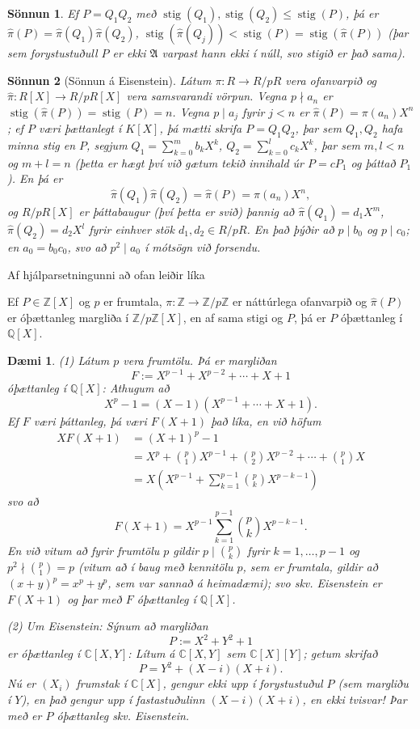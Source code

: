 \documentclass[a4paper,icelandic,11pt]{book}
\theoremstyle{plain}
\newtheorem{daemi}{Dæmi}[chapter]
\newtheorem*{sonnun}{Sönnun}
\newcommand{\Z}{\mathbb{Z}}
\newcommand{\Q}{\mathbb{Q}}
\newcommand{\C}{\mathbb{C}}
\DeclareMathOperator{\stig}{stig} %
\begin{document}
\begin{sonnun}
  Ef $P = Q_1 Q_2$ með $\stig(Q_1),\stig(Q_2)\leq \stig(P)$,  þá er $\hat\pi(P)
  = \hat\pi(Q_1)\hat\pi(Q_2)$, $\stig(\hat\pi(Q_j)) <
  \stig(P)=\stig(\hat\pi(P))$ (þar sem forystustuðull $P$ er ekki $\mathfrak A$
  varpast hann ekki í núll, svo stigið er það sama).
\end{sonnun}
\begin{sonnun}
  [Sönnun á Eisenstein]
  Látum $\pi : R\to R/pR$ vera ofanvarpið og $\hat\pi : R[X]\to R/pR[X]$ vera
  samsvarandi vörpun. Vegna $p\nmid a_n$ er $\stig(\hat\pi(P)) = \stig(P) = n$.
  Vegna $p\mid a_j$ fyrir $j < n$ er $\hat\pi(P) = \pi(a_n)X^n$; ef $P$ væri
  þættanlegt í $K[X]$, þá mætti skrifa $P=Q_1Q_2$, þar sem $Q_1,Q_2$ hafa minna
  stig en $P$, segjum $Q_1 = \sum_{k=0}^m b_k X^k$, $Q_2 = \sum_{k=0}^l c_k
  X^k$, þar sem $m,l < n$ og $m+l = n$ (þetta er hægt því við gætum tekið
  innihald úr $P = cP_1$ og þáttað $P_1$). En þá er \[
  \hat\pi(Q_1) \hat\pi(Q_2) = \hat\pi(P) = \pi(a_n) X^n,
  \]
  og $R/pR[X]$ er þáttabaugur (því þetta er svið) þannig að $\hat\pi(Q_1) = d_1
  X^m$, $\hat\pi (Q_2) = d_2 X^l$ fyrir einhver stök $d_1,d_2\in R/pR$. En það
  þýðir að $p \mid b_0$ og $p\mid c_0$; en $a_0 = b_0 c_0$, svo að $p^2\mid a_0$
  í mótsögn við forsendu. 
\end{sonnun}
Af hjálparsetningunni að ofan leiðir líka
\begin{setn}
  Ef $P\in\Z[X]$ og $p$ er frumtala, $\pi:\Z\to\Z/p\Z$ er náttúrlega ofanvarpið
  og $\hat\pi(P)$ er óþættanleg margliða í $\Z/p\Z[X]$, en af sama stigi og $P$,
  þá er $P$ óþættanleg í $\Q[X]$. 
\end{setn}
\begin{daemi}
  (1) Látum $p$ vera frumtölu. Þá er margliðan \[
  F := X^{p-1} + X^{p-2} + \cdots + X + 1
  \]
  óþættanleg í $\Q[X]$: Athugum að\[
  X^p - 1 = (X-1)(X^{p-1} + \cdots + X + 1).
  \]
  Ef $F$ væri þáttanleg, þá væri $F(X+1)$ það líka, en við höfum
  \begin{align*}
    XF(X+1) 
    &= (X+1)^p - 1 \\
    &= X^p + \binom p1 X^{p-1} + \binom p2 X^{p-2} + \cdots + \binom p1 X\\
    &= X\left( X^{p-1} + \sum_{k=1}^{p-1}\binom pk X^{p-k-1}  \right)
  \end{align*}
  svo að \[
  F(X+1) = X^{p-1} \sum_{k=1}^{p-1}\binom pk X^{p-k-1}.
  \]
  En við vitum að fyrir frumtölu $p$ gildir $p\mid \binom pk$ fyrir
  $k=1,\dots,p-1$ og $p^2\nmid\binom p1 = p$ (vitum að í baug með kennitölu $p$,
  sem er frumtala, gildir að $(x+y)^p = x^p + y^p$, sem var sannað á heimadæmi);
  svo skv. Eisenstein er $F(X+1)$ og þar með $F$ óþættanleg í $\Q[X]$.

  (2) Um Eisenstein: Sýnum að margliðan \[
  P := X^2 + Y^2 + 1
  \]
  er óþættanleg í $\C[X,Y]$: Lítum á $\C[X,Y]$ sem $\C[X][Y]$; getum skrifað \[
  P = Y^2 + (X-i)(X+i).
  \]
  Nú er $(X_i)$ frumstak í $\C[X]$, gengur ekki upp í forystustuðul $P$ (sem
  margliðu í $Y$), en það gengur upp í fastastuðulinn $(X-i)(X+i)$, en ekki
  tvisvar! Þar með er $P$ óþættanleg skv. Eisenstein.
\end{daemi}
\end{document}
